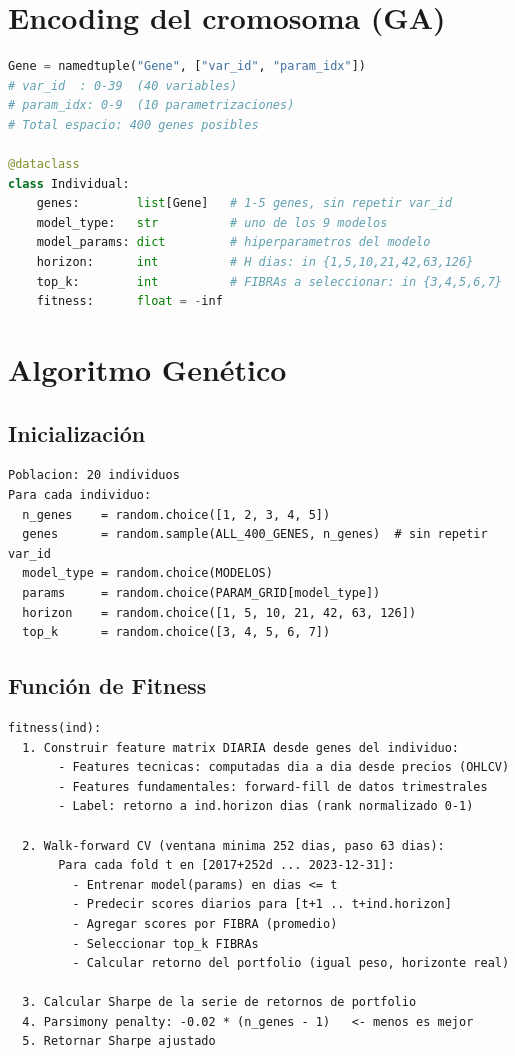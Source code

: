 \documentclass[12pt,letterpaper]{article}
\begin{document}
\section{Encoding del cromosoma (GA)}

\begin{lstlisting}[language=Python]
Gene = namedtuple("Gene", ["var_id", "param_idx"])
# var_id  : 0-39  (40 variables)
# param_idx: 0-9  (10 parametrizaciones)
# Total espacio: 400 genes posibles

@dataclass
class Individual:
    genes:        list[Gene]   # 1-5 genes, sin repetir var_id
    model_type:   str          # uno de los 9 modelos
    model_params: dict         # hiperparametros del modelo
    horizon:      int          # H dias: in {1,5,10,21,42,63,126}
    top_k:        int          # FIBRAs a seleccionar: in {3,4,5,6,7}
    fitness:      float = -inf
\end{lstlisting}

\section{Algoritmo Genético}

\subsection{Inicialización}
\begin{lstlisting}
Poblacion: 20 individuos
Para cada individuo:
  n_genes    = random.choice([1, 2, 3, 4, 5])
  genes      = random.sample(ALL_400_GENES, n_genes)  # sin repetir var_id
  model_type = random.choice(MODELOS)
  params     = random.choice(PARAM_GRID[model_type])
  horizon    = random.choice([1, 5, 10, 21, 42, 63, 126])
  top_k      = random.choice([3, 4, 5, 6, 7])
\end{lstlisting}

\subsection{Función de Fitness}
\begin{lstlisting}
fitness(ind):
  1. Construir feature matrix DIARIA desde genes del individuo:
       - Features tecnicas: computadas dia a dia desde precios (OHLCV)
       - Features fundamentales: forward-fill de datos trimestrales
       - Label: retorno a ind.horizon dias (rank normalizado 0-1)

  2. Walk-forward CV (ventana minima 252 dias, paso 63 dias):
       Para cada fold t en [2017+252d ... 2023-12-31]:
         - Entrenar model(params) en dias <= t
         - Predecir scores diarios para [t+1 .. t+ind.horizon]
         - Agregar scores por FIBRA (promedio)
         - Seleccionar top_k FIBRAs
         - Calcular retorno del portfolio (igual peso, horizonte real)

  3. Calcular Sharpe de la serie de retornos de portfolio
  4. Parsimony penalty: -0.02 * (n_genes - 1)   <- menos es mejor
  5. Retornar Sharpe ajustado
\end{lstlisting}
\end{document}
